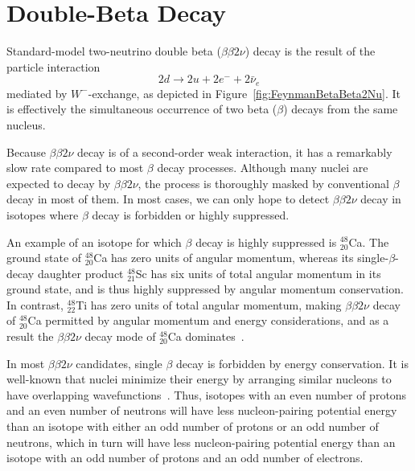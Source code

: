 \section{Double-Beta Decay}\label{sec:TheoryStandardDoubleBeta}

Standard-model two-neutrino double beta ($\beta\beta 2\nu$) decay is the result of the particle interaction
\begin{equation}\label{eqn:bb2n_decay_reaction}
2d \rightarrow 2u + 2e^- + 2\bar{\nu}_e
\end{equation}
mediated by $W^-$-exchange, as depicted in Figure~\ref{fig:FeynmanBetaBeta2Nu}.  It is effectively the simultaneous occurrence of two beta ($\beta$) decays from the same nucleus.

Because $\beta\beta 2\nu$ decay is of a second-order weak interaction, it has a remarkably slow rate compared to most $\beta$ decay processes.  Although many nuclei are expected to decay by $\beta\beta 2\nu$, the process is thoroughly masked by conventional $\beta$ decay in most of them.  In most cases, we can only hope to detect $\beta\beta 2\nu$ decay in isotopes where $\beta$ decay is forbidden or highly suppressed.

An example of an isotope for which $\beta$ decay is highly suppressed is $^{48}_{20}$Ca.  The ground state of $^{48}_{20}$Ca has zero units of angular momentum, whereas its single-$\beta$-decay daughter product $^{48}_{21}$Sc has six units of total angular momentum in its ground state, and is thus highly suppressed by angular momentum conservation.  In contrast, $^{48}_{22}$Ti has zero units of total angular momentum, making $\beta\beta 2\nu$ decay of $^{48}_{20}$Ca permitted by angular momentum and energy considerations, and as a result the $\beta\beta 2\nu$ decay mode of $^{48}_{20}$Ca dominates~\cite{MyNuclearPhysicsBook}.

In most $\beta\beta 2\nu$ candidates, single $\beta$ decay is forbidden by energy conservation.  It is well-known that nuclei minimize their energy by arranging similar nucleons to have overlapping wavefunctions~\cite{MyNuclearPhysicsBook}.  Thus, isotopes with an even number of protons and an even number of neutrons will have less nucleon-pairing potential energy than an isotope with either an odd number of protons or an odd number of neutrons, which in turn will have less nucleon-pairing potential energy than an isotope with an odd number of protons and an odd number of electrons.

